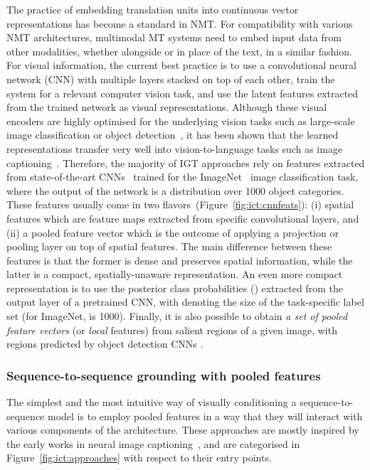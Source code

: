 \documentclass{svjour3}
\begin{document}
The practice of embedding translation units into continuous vector representations has become a standard in NMT. For compatibility with various NMT architectures, multimodal MT systems need to embed input data from other modalities, whether alongside or in place of the text, in a similar fashion. For visual information, the current best practice is to use a convolutional neural network (CNN) with multiple layers stacked on top of each other, train the system for a relevant computer vision task, and use the latent features extracted from the trained network as visual representations. Although these visual encoders are highly optimised for the underlying vision tasks such as large-scale image classification or object detection~\citep{russakovsky-ilsvrc-2015}, it has been shown that the learned representations transfer very well into vision-to-language tasks such as image captioning~\citep{vinyals-show-2015, xu-show-2015}. Therefore,
the majority of IGT approaches rely on features extracted from state-of-the-art CNNs~\citep{simonyan-vgg-2014,ioffe-batch-2015,he-resnet-2016} trained for the ImageNet~\citep{deng-imagenet-2009} image classification task, where the output of the network is a distribution over 1000 object categories. These features usually come in two flavors~(Figure~\ref{fig:ict:cnnfeats}):
(i) spatial features which are feature maps  extracted from specific convolutional layers, and (ii) a pooled feature vector  which is the outcome of applying a projection or pooling layer on top of spatial features. The main difference between these features is that the former is dense and preserves spatial information, while the latter is a compact, spatially-unaware representation. An even more compact representation is to use the posterior class probabilities () extracted from the output layer of a pretrained CNN, with  denoting the size of the task-specific label set (for ImageNet,  is 1000).
Finally, it is also possible to obtain \emph{a set of pooled feature vectors} (or \textit{local} features) from salient regions of a given image, with regions predicted by object detection CNNs \citep{girshick-rcnn-2014}.

\subsubsection{Sequence-to-sequence grounding with pooled features}
\label{sec:tasks:ict:cond}
The simplest and the most intuitive way of visually conditioning a sequence-to-sequence model is to employ pooled features in a way that they will interact with various components of the architecture.
These approaches are mostly inspired by the early works in neural image captioning~\citep{kiros-multimodal-2014,mao-deep-2014,vinyals-show-2015}, and are categorised in Figure~\ref{fig:ict:approaches} with respect to their entry points.
\end{document}
